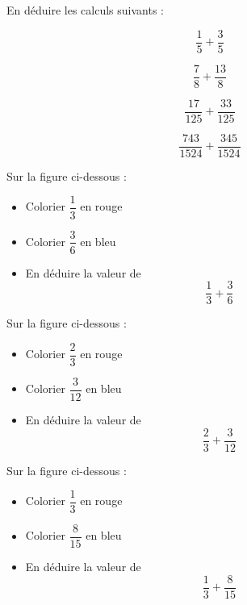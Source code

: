 En déduire les calculs suivants :

\begin{multicols}{4}
    $$\dfrac{1}{5}+\dfrac{3}{5}$$

    $$\dfrac{7}{8}+\dfrac{13}{8}$$

    $$\dfrac{17}{125}+\dfrac{33}{125}$$

    $$\dfrac{743}{1524}+\dfrac{345}{1524}$$
\end{multicols}

\vfill

\begin{minipage}[t]{0.3\textwidth}
    Sur la figure ci-dessous :
    \begin{itemize}
        \item Colorier $\dfrac{1}{3}$ en rouge
        \item Colorier $\dfrac{3}{6}$ en bleu
        \item En déduire la valeur de $$\dfrac{1}{3}+\dfrac{3}{6}$$
    \end{itemize}
    \begin{figure}[H]
        \center
    \end{figure}
\end{minipage}
\hfil
\vrule
\hfil
\begin{minipage}[t]{0.3\textwidth}
    Sur la figure ci-dessous :
    \begin{itemize}
        \item Colorier $\dfrac{2}{3}$ en rouge
        \item Colorier $\dfrac{3}{12}$ en bleu
        \item En déduire la valeur de $$\dfrac{2}{3}+\dfrac{3}{12}$$
    \end{itemize}
    \begin{figure}[H]
        \center
    \end{figure}
\end{minipage}
\hfil
\vrule
\hfil
\begin{minipage}[t]{0.3\textwidth}
    Sur la figure ci-dessous :
    \begin{itemize}
        \item Colorier $\dfrac{1}{3}$ en rouge
        \item Colorier $\dfrac{8}{15}$ en bleu
        \item En déduire la valeur de $$\dfrac{1}{3}+\dfrac{8}{15}$$
    \end{itemize}
    \begin{figure}[H]
        \center
    \end{figure}
\end{minipage}

